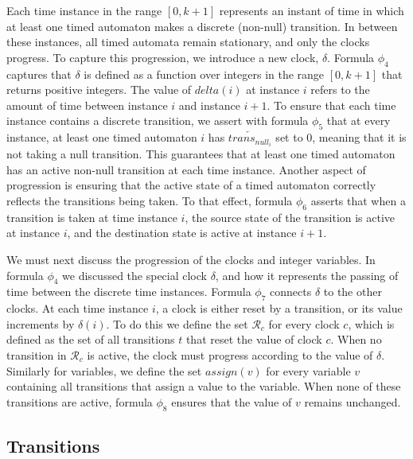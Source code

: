 \documentclass[a4paper,12pt]{article}
\begin{document}
Each time instance in the range \([0,k+1]\) represents an instant of time in
which at least one timed automaton makes a discrete (non-null) transition. In
between these instances, all timed automata remain stationary, and only the
clocks progress. To capture this progression, we introduce a new clock,
\(\delta\). Formula \(\phi_4\) captures that \(\delta\) is defined as a function
over integers in the range \([0,k+1]\) that returns positive integers. The value
of \(delta(i)\) at instance \(i\) refers to the amount of time between instance
\(i\) and instance \(i+1\). To ensure that each time instance contains a
discrete transition, we assert with formula \(\phi_5\) that at every instance,
at least one timed automaton \(i\) has \(\overleftarrow{trans_{null_i}}\) set to
0, meaning that it is not taking a null transition. This guarantees that at
least one timed automaton has an active non-null transition at each time
instance. Another aspect of progression is ensuring that the active state of a
timed automaton correctly reflects the transitions being taken. To that effect,
formula \(\phi_6\) asserts that when a transition is taken at time instance
\(i\), the source state of the transition is active at instance \(i\), and the
destination state is active at instance \(i+1\).

We must next discuss the progression of the clocks and integer variables. In
formula \(\phi_4\) we discussed the special clock \(\delta\), and how it
represents the passing of time between the discrete time instances. Formula
\(\phi_7\) connects \(\delta\) to the other clocks. At each time instance \(i\),
a clock is either reset by a transition, or its value increments by
\(\delta(i)\). To do this we define the set \(\mathcal{R}_c\) for every clock
\(c\), which is defined as the set of all transitions \(t\) that reset the value
of clock \(c\). When no transition in \(\mathcal{R}_c\) is active, the clock
must progress according to the value of \(\delta\). Similarly for variables, we
define the set \(assign(v)\) for every variable \(v\) containing all transitions
that assign a value to the variable. When none of these transitions are active,
formula \(\phi_8\) ensures that the value of \(v\) remains unchanged.

\subsection{Transitions}
\label{sec:orgdaab944}
\end{document}
